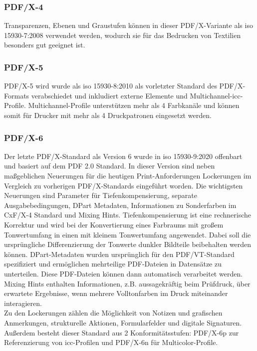 \subsubsection{PDF/X-4}
Transparenzen, Ebenen und Graustufen können in dieser PDF/X-Variante als \gls{iso} 15930-7:2008 \cite{proj-consult} verwendet werden, wodurch sie für das Bedrucken von Textilien besonders gut geeignet ist. \cite{adobe-pdf-x} 

\subsubsection{PDF/X-5}
PDF/X-5 wird wurde als \gls{iso} 15930-8:2010 als vorletzter Standard des PDF/X-Formats verabschiedet und inkludiert externe Elemente und Multichannel-\gls{icc}-Profile. \cite{proj-consult} Multichannel-Profile unterstützen mehr als 4 Farbkanäle und können somit für Drucker mit mehr als 4 Druckpatronen eingesetzt werden. \cite{adobe-profil}

\subsubsection{PDF/X-6}
Der letzte PDF/X-Standard als Version 6 wurde in \gls{iso} 15930-9:2020 offenbart und basiert auf dem PDF 2.0 Standard. In dieser Version sind neben maßgeblichen Neuerungen für die heutigen Print-Anforderungen Lockerungen im Vergleich zu vorherigen PDF/X-Standards eingeführt worden. Die wichtigsten Neuerungen sind Parameter für Tiefenkompensierung, separate Ausgabebedingungen, DPart Metadaten, Informationen zu Sonderfarben im CxF/X-4 Standard und Mixing Hints. \cite{proj-consult}
Tiefenkompensierung ist eine rechnerische Korrektur und wird bei der Konvertierung eines Farbraums mit großem Tonwertumfang in einen mit kleinem Tonwertumfang angewendet. Dabei soll die ursprüngliche Differenzierung der Tonwerte dunkler Bildteile beibehalten werden können. \cite{tiefen} 
DPart-Metadaten wurden ursprünglich für den PDF/VT-Standard spezifiziert und ermöglichen mehrteilige PDF-Dateien in Datensätze zu unterteilen. Diese PDF-Dateien können dann automatisch verarbeitet werden. \cite{pdfa-dpart} Mixing Hints enthalten Informationen, z.B. aussagekräftig beim Prüfdruck, über erwartete Ergebnisse, wenn mehrere Volltonfarben im Druck miteinander interagieren. \cite{mixing-hints} \\
Zu den Lockerungen zählen die Möglichkeit von Notizen und grafischen Anmerkungen, strukturelle Aktionen, Formularfelder und digitale Signaturen. Außerdem besteht dieser Standard aus 2 Konformitätsstufen: PDF/X-6p zur Referenzierung von \gls{icc}-Profilen und PDF/X-6n für Multicolor-Profile. \cite{proj-consult}


